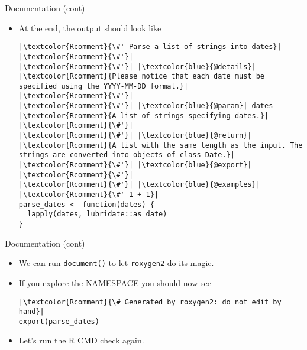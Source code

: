 \documentclass[
hyperref={bookmarks=false},
xcolor={dvipsnames,svgnames*,x11names*}, 
12pt
]{beamer}
\begin{document}
\begin{frame}[fragile]{Documentation (cont)}
\vspace{-0.5cm}
\begin{itemize}
\itemsep 2ex
\item At the end, the output should look like
\begin{lstlisting}
|\textcolor{Rcomment}{\#' Parse a list of strings into dates}|
|\textcolor{Rcomment}{\#'}|
|\textcolor{Rcomment}{\#'}| |\textcolor{blue}{@details}| |\textcolor{Rcomment}{Please notice that each date must be specified using the YYYY-MM-DD format.}|
|\textcolor{Rcomment}{\#'}|
|\textcolor{Rcomment}{\#'}| |\textcolor{blue}{@param}| dates |\textcolor{Rcomment}{A list of strings specifying dates.}|
|\textcolor{Rcomment}{\#'}|
|\textcolor{Rcomment}{\#'}| |\textcolor{blue}{@return}| |\textcolor{Rcomment}{A list with the same length as the input. The strings are converted into objects of class Date.}|
|\textcolor{Rcomment}{\#'}| |\textcolor{blue}{@export}|
|\textcolor{Rcomment}{\#'}|
|\textcolor{Rcomment}{\#'}| |\textcolor{blue}{@examples}|
|\textcolor{Rcomment}{\#' 1 + 1}|
parse_dates <- function(dates) {
  lapply(dates, lubridate::as_date)
}
\end{lstlisting}
\end{itemize}
\end{frame}

\begin{frame}[fragile]{Documentation (cont)}
\vspace{-0.5cm}
\begin{itemize}
\itemsep 3ex
\item We can run \texttt{document()} to let \texttt{roxygen2} do its magic. 
\item If you explore the NAMESPACE you should now see 
\begin{lstlisting}
|\textcolor{Rcomment}{\# Generated by roxygen2: do not edit by hand}|
export(parse_dates)
\end{lstlisting}
\item Let's run the R CMD check again. 
\end{itemize}
\end{frame}
\end{document}
